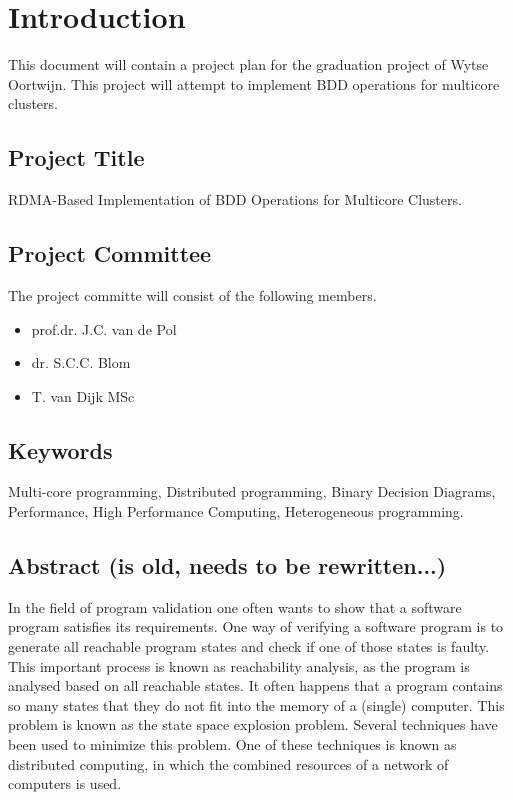 \chapter{Introduction}
This document will contain a project plan for the graduation project of Wytse Oortwijn. This project will attempt to implement BDD operations for multicore clusters. 

\section{Project Title}
RDMA-Based Implementation of BDD Operations for Multicore Clusters.

\section{Project Committee}
The project committe will consist of the following members.
\begin{itemize}
	\item prof.dr. J.C. van de Pol
	\item dr. S.C.C. Blom
	\item T. van Dijk MSc
\end{itemize}

\section{Keywords}
Multi-core programming, Distributed programming, Binary Decision Diagrams, Performance, High Performance Computing, Heterogeneous programming.

\section{Abstract (is old, needs to be rewritten...)}
In the field of program validation one often wants to show that a software program satisfies its requirements. One way of verifying a software program is to generate all reachable program states and check if one of those states is faulty. This important process is known as reachability analysis, as the program is analysed based on all reachable states. It often happens that a program contains so many states that they do not fit into the memory of a (single) computer. This problem is known as the state space explosion problem. Several techniques have been used to minimize this problem. One of these techniques is known as distributed computing, in which the combined resources of a network of computers is used.

